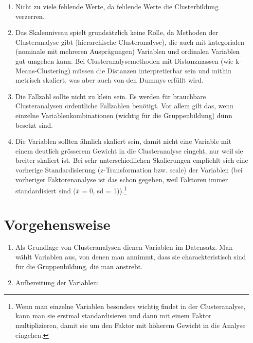 \documentclass[
  10pt,
  letterpaper,
  a4paper, twoside]{scrreprt}
\begin{document}
\begin{enumerate}
\def\labelenumi{\arabic{enumi}.}
\item
  Nicht zu viele fehlende Werte, da fehlende Werte die Clusterbildung
  verzerren.
\item
  Das Skalenniveau spielt grundsätzlich keine Rolle, da Methoden der
  Clusteranalyse gibt (hierarchische Clusteranalyse), die auch mit
  kategorialen (nominale mit mehreren Ausprägungen) Variablen und
  ordinalen Variablen gut umgehen kann. Bei Clusteranalysemethoden mit
  Distanzmassen (wie k-Means-Clustering) müssen die Distanzen
  interpretierbar sein und mithin metrisch skaliert, was aber auch von
  den Dummys erfüllt wird.
\item
  Die Fallzahl sollte nicht zu klein sein. Es werden für brauchbare
  Clusteranalysen ordentliche Fallzahlen benötigt. Vor allem gilt das,
  wenn einzelne Variablenkombinationen (wichtig für die Gruppenbildung)
  dünn besetzt sind.
\item
  Die Variablen sollten ähnlich skaliert sein, damit nicht eine Variable
  mit einem deutlich grösserem Gewicht in die Clusteranalyse eingeht,
  nur weil sie breiter skaliert ist. Bei sehr unterschiedlichen
  Skalierungen empfiehlt sich eine vorherige Standardisierung
  (z-Transformation bzw. scale) der Variablen (bei vorheriger
  Faktorenanalyse ist das schon gegeben, weil Faktoren immer
  standardisiert sind (\(\overline{x}\) = 0, sd = 1)).\footnote{Wenn man
    einzelne Variablen besonders wichtig findet in der Clusteranalyse,
    kann man sie erstmal standardisieren und dann mit einem Faktor
    multiplizieren, damit sie um den Faktor mit höherem Gewicht in die
    Analyse eingehen.}
\end{enumerate}

\section{Vorgehensweise}\label{vorgehensweise}

\begin{enumerate}
\def\labelenumi{\arabic{enumi}.}
\item
  Als Grundlage von Clusteranalysen dienen Variablen im Datensatz. Man
  wählt Variablen aus, von denen man annimmt, dass sie charackteristisch
  sind für die Gruppenbildung, die man anstrebt.
\item
  Aufbereitung der Variablen:
\end{enumerate}
\end{document}
